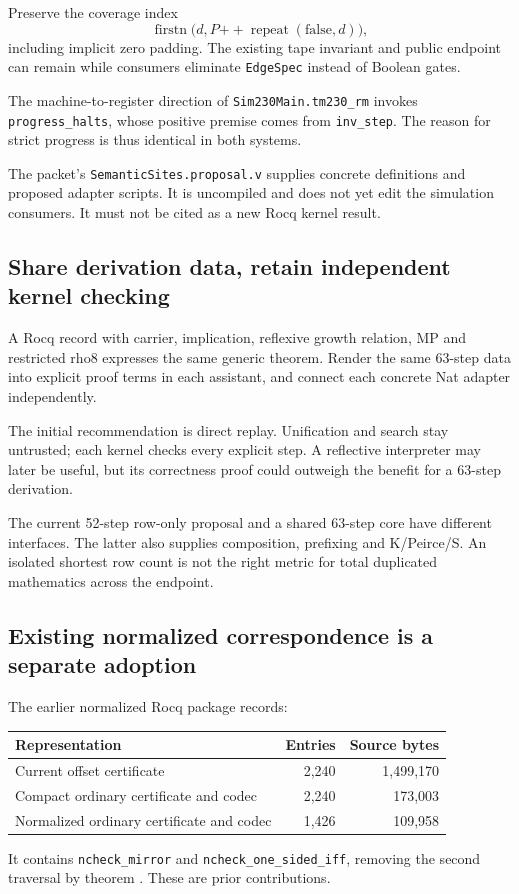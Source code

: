 \documentclass[11pt,letterpaper]{article}
\newcommand{\code}[1]{\texttt{#1}}
\begin{document}
Preserve the coverage index
\[
 \operatorname{firstn}
 \bigl(d,P\mathbin{+\!\!+}\operatorname{repeat}(\mathrm{false},d)\bigr),
\]
including implicit zero padding. The existing tape invariant and public endpoint
can remain while consumers eliminate \code{EdgeSpec} instead of Boolean gates.

The machine-to-register direction of \code{Sim230Main.tm230\_rm} invokes
\code{progress\_halts}, whose positive premise comes from \code{inv\_step}.
The reason for strict progress is thus identical in both systems.

The packet's \code{SemanticSites.proposal.v} supplies concrete definitions and
proposed adapter scripts. It is uncompiled and does not yet edit the simulation
consumers. It must not be cited as a new Rocq kernel result.

\subsection{Share derivation data, retain independent kernel checking}

A Rocq record with carrier, implication, reflexive growth relation, MP and
restricted rho8 expresses the same generic theorem. Render the same 63-step
data into explicit proof terms in each assistant, and connect each concrete
Nat adapter independently.

The initial recommendation is direct replay. Unification and search stay
untrusted; each kernel checks every explicit step. A reflective interpreter may
later be useful, but its correctness proof could outweigh the benefit for a
63-step derivation.

The current 52-step row-only proposal and a shared 63-step core have different
interfaces. The latter also supplies composition, prefixing and K/Peirce/S.
An isolated shortest row count is not the right metric for total duplicated
mathematics across the endpoint.

\subsection{Existing normalized correspondence is a separate adoption}

The earlier normalized Rocq package records:
\begin{center}
\begin{tabular}{lrr}
\toprule
Representation & Entries & Source bytes\\
\midrule
Current offset certificate & 2,240 & 1,499,170\\
Compact ordinary certificate and codec & 2,240 & 173,003\\
Normalized ordinary certificate and codec & 1,426 & 109,958\\
\bottomrule
\end{tabular}
\end{center}
It contains \code{ncheck\_mirror} and \code{ncheck\_one\_sided\_iff}, removing
the second traversal by theorem \cite{normalized}. These are prior contributions.
\end{document}
